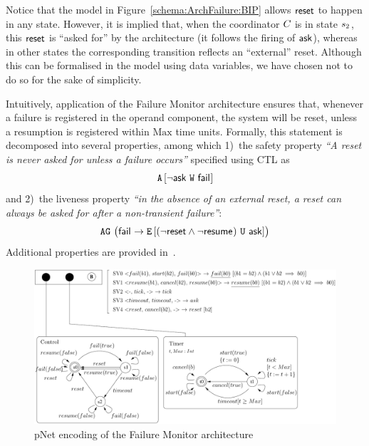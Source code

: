 \documentclass[smallcondensed]{svjour3}
\newcommand{\TODO}[1]{\textcolor{red}{\textbf{[TODO:#1]}}}
\newcommand{\AG}[1][\ ]{\ensuremath{\mathtt{AG}#1}}
\newcommand{\EX}[1][\ ]{\ensuremath{\mathtt{EX}#1}}
\newcommand{\AW}[3][\ ]{\ensuremath{\mathtt{A}\left[#2\ \mathtt{W}\ #3\right]#1}}
\newcommand{\EU}[3][\ ]{\ensuremath{\mathtt{E}\left[#2\ \mathtt{U}\ #3\right]#1}}
\begin{document}
%

Notice that the model in Figure~\ref{schema:ArchFailure:BIP} allows
$\mathsf{reset}$ to happen in any state.  However, it is implied that,
when the coordinator $C_{}$ is in state $\cstate{2}$, this
$\mathsf{reset}$ is ``asked for'' by the architecture (it follows the
firing of $\mathsf{ask}$), whereas in other states the corresponding
transition reflects an ``external'' reset.  Although this can be
formalised in the model using data variables, we have chosen not to do
so for the sake of simplicity.

Intuitively, application of the Failure Monitor architecture ensures
that, whenever a failure is registered in the operand component, the
system will be reset, unless a resumption is registered within
$\mathrm{Max}$ time units.  Formally, this statement is decomposed
into several properties, among which 
%
1)~the safety property \emph{``A reset is never asked for unless a failure occurs''} specified using CTL as
%
\begin{equation}
  \label{eq:FM:safety}
  \AW[]{\lnot \PortAsk}{\PortFail}
\end{equation}
%
and 2)~the liveness property \emph{``in the absence of an external
  reset, a reset can always be asked for after a non-transient
  failure''}:
%
\begin{equation}
  \label{eq:FM:liveness}
  \AG \bigl(
  \PortFail \rightarrow \EU[]{(\lnot \PortReset \land \lnot \PortResume)}{\PortAsk}
  \bigr)
\end{equation}
%
Additional properties are provided in~\cite{Avocs-RR}.



\begin{figure}[t]
  \centering
  \includegraphics[width=0.9\columnwidth]{ActaXFIG/FailureTimerPNET-v2-2}
  \caption{pNet encoding of the Failure Monitor architecture}
  \label{schema:ArchFailure:pNet}
\end{figure}
\end{document}
